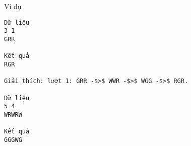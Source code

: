 Ví dụ
\begin{verbatim}
Dữ liệu
3 1
GRR

Kết quả 
RGR

Giải thích: lượt 1: GRR -$>$ WWR -$>$ WGG -$>$ RGR.

Dữ liệu
5 4
WRWRW

Kết quả 
GGGWG
\end{verbatim}